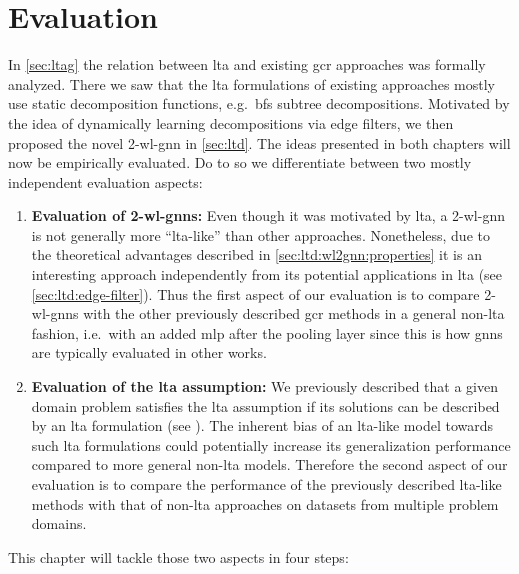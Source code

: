 \chapter{Evaluation}%
\label{sec:eval}

In \cref{sec:ltag} the relation between \ac{lta} and existing \ac{gcr} approaches was formally analyzed.
There we saw that the \ac{lta} formulations of existing approaches mostly use static decomposition functions, e.g.\ \ac{bfs} subtree decompositions.
Motivated by the idea of dynamically learning decompositions via edge filters, we then proposed the novel 2-\acs{wl}-\acs{gnn} in \cref{sec:ltd}.
The ideas presented in both chapters will now be empirically evaluated.
Do to so we differentiate between two mostly independent evaluation aspects:
\begin{enumerate}[label={\textbf{\arabic*.}}]
	\item \textbf{Evaluation of 2-\acs{wl}-\acsp{gnn}:}
		Even though it was motivated by \ac{lta}, a 2-\acs{wl}-\acs{gnn} is not generally more ``\acs{lta}-like'' than other approaches.
		Nonetheless, due to the theoretical advantages described in \cref{sec:ltd:wl2gnn:properties} it is an interesting approach independently from its potential applications in \ac{lta} (see \cref{sec:ltd:edge-filter}).
		Thus the first aspect of our evaluation is to compare 2-\acs{wl}-\acsp{gnn} with the other previously described \ac{gcr} methods in a general non-\acs{lta} fashion, i.e.\ with an added \ac{mlp} after the pooling layer since this is how \acp{gnn} are typically evaluated in other works.
	\item \textbf{Evaluation of the \ac{lta} assumption:}
		We previously described that a given domain problem satisfies the \ac{lta} assumption if its solutions can be described by an \ac{lta} formulation (see ).
		The inherent bias of an \acs{lta}-like model towards such \ac{lta} formulations could potentially increase its generalization performance compared to more general non-\acs{lta} models.
		Therefore the second aspect of our evaluation is to compare the performance of the previously described \acs{lta}-like methods with that of non-\acs{lta} approaches on datasets from multiple problem domains.
\end{enumerate}
This chapter will tackle those two aspects in four steps:
